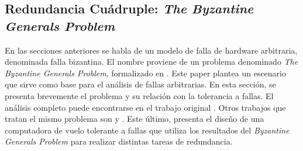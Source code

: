 



\subsection*{Redundancia Cuádruple: \textit{The Byzantine Generals Problem}}

En las secciones anteriores se habla de un modelo de falla de hardware arbitraria, denominada falla bizantina. El nombre proviene de un problema denominado \textit{The Byzantine Generals Problem}, formalizado en \cite{lamport2019byzantine}. Este paper plantea un escenario que sirve como base para el análisis de fallas arbitrarias. En esta sección, se presenta brevemente el problema y su relación con la tolerancia a fallas. El análisis completo puede encontrarse en el trabajo original \cite{lamport2019byzantine}. Otros trabajos que tratan el mismo problema son \cite{pease1980reaching} y \cite{wensley1978sift}. Este último, presenta el diseño de una computadora de vuelo tolerante a fallas que utiliza los resultados del \textit{Byzantine Generals Problem} para realizar distintas tareas de redundancia.

